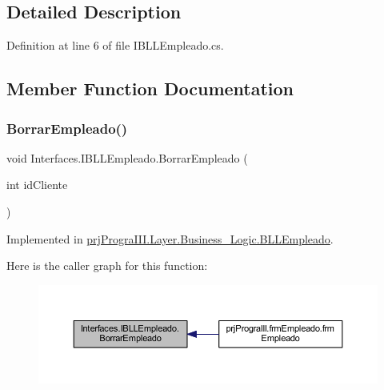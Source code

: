 \subsection{Detailed Description}


Definition at line 6 of file I\+B\+L\+L\+Empleado.\+cs.



\subsection{Member Function Documentation}
\hypertarget{interface_interfaces_1_1_i_b_l_l_empleado_a284b5811be96490bc0567612f428e8a5}{}\label{interface_interfaces_1_1_i_b_l_l_empleado_a284b5811be96490bc0567612f428e8a5} 
\subsubsection{\texorpdfstring{Borrar\+Empleado()}{BorrarEmpleado()}}
{\footnotesize\ttfamily void Interfaces.\+I\+B\+L\+L\+Empleado.\+Borrar\+Empleado (\begin{DoxyParamCaption}\item[{int}]{id\+Cliente }\end{DoxyParamCaption})}



Implemented in \hyperlink{classprj_progra_i_i_i_1_1_layer_1_1_business___logic_1_1_b_l_l_empleado_a1a8bb078f6d78bb7a1153f25b9006c73}{prj\+Progra\+I\+I\+I.\+Layer.\+Business\+\_\+\+Logic.\+B\+L\+L\+Empleado}.

Here is the caller graph for this function\+:
\nopagebreak
\begin{figure}[H]
\begin{center}
\leavevmode
\includegraphics[width=350pt]{interface_interfaces_1_1_i_b_l_l_empleado_a284b5811be96490bc0567612f428e8a5_icgraph}
\end{center}
\end{figure}
\hypertarget{interface_interfaces_1_1_i_b_l_l_empleado_a9eea24cebb452257b579be1c998f4a98}{}\label{interface_interfaces_1_1_i_b_l_l_empleado_a9eea24cebb452257b579be1c998f4a98} 
